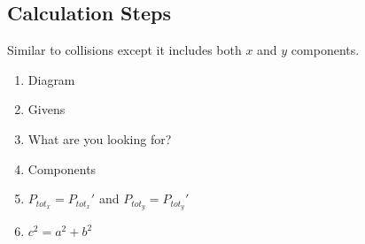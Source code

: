 \begin{adjustwidth}{1cm}{0pt}
    \subsection*{Calculation Steps}
    \begin{flushleft}
        Similar to collisions except it includes both $x$ and $y$ components.
    \end{flushleft}
    \vspace*{5pt}
    \begin{adjustwidth}{0.5cm}{0pt}
        \begin{enumerate}
            \item Diagram
            \item Givens
            \item What are you looking for?
            \item Components
            \item $P_{tot_{x}} = P_{tot_{x}}\prime$ and $P_{tot_{y}} = P_{tot_{y}}\prime$
            \item $c^2 = a^2 + b^2$
        \end{enumerate}
    \end{adjustwidth}
\end{adjustwidth}
